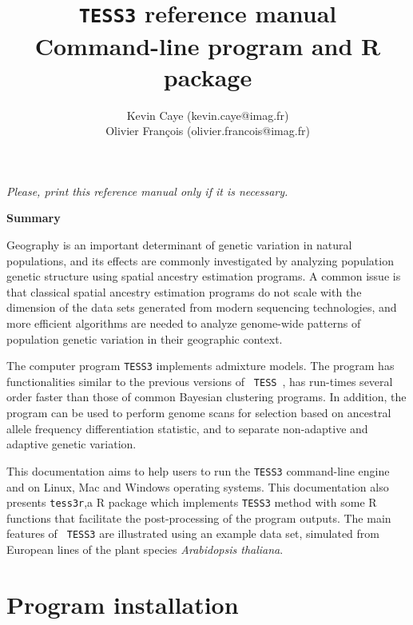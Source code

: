 \documentclass[10pt,a4paper]{article}
\title{{\tt TESS3} reference manual \\
Command-line program and R package
}
\author{
        Kevin Caye (kevin.caye@imag.fr)\\
        Olivier Fran\c cois (olivier.francois@imag.fr)\\
}
\begin{document}
\maketitle
\begin{center}
{\it Please, print this reference manual only if it is necessary.}
\end{center}

\vspace{.5cm}

\begin{center} {\bf Summary}
\end{center}


\vspace{.5cm}

Geography is an important determinant of genetic variation in natural 
populations, and its effects are commonly investigated by analyzing population 
genetic structure using spatial ancestry estimation programs. A common issue is 
that classical spatial ancestry estimation programs do not scale with the 
dimension of the data sets generated from modern sequencing technologies, and 
more efficient algorithms are needed to analyze genome-wide patterns of 
population genetic variation in their geographic context.

The computer program {\tt TESS3} implements admixture models. The program has 
functionalities similar to the previous versions of {\tt 
TESS}~\cite{chen2007bayesian,durand2009spatial}, has run-times several order 
faster than those of common Bayesian clustering programs. In addition, the 
program can be used to perform genome scans for selection based on ancestral 
allele frequency differentiation statistic, and to separate non-adaptive and 
adaptive genetic variation.

This documentation aims to help users to run the {\tt TESS3} command-line engine 
and on Linux, Mac and Windows operating systems. This documentation also presents {\tt tess3r},a R package 
which implements {\tt TESS3} method with some R functions that facilitate the 
post-processing of the program outputs. The main features of {\tt 
TESS3} are illustrated using an example data set, simulated from European lines 
of the plant species {\it Arabidopsis thaliana}.

\vspace{.5cm}


\section{Program installation} 
\end{document}
